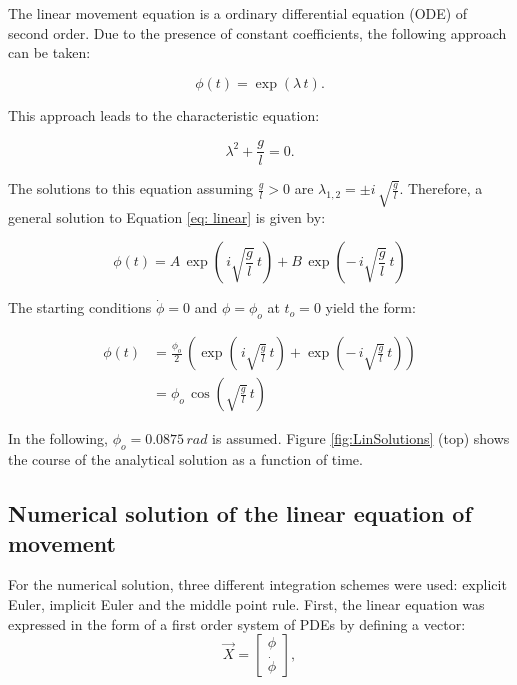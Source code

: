 \documentclass[12pt,bibstyle=none,pagenumberinfooter]{ifmdocument}
\begin{document}
The linear movement equation is a ordinary differential equation (ODE) of second order. Due to the presence of constant coefficients, the following approach can be taken:

\begin{equation}
    \label{eq: linear}
    \phi (t) = \exp{(\lambda \, t)}.
\end{equation}

This approach leads to the characteristic equation:

\begin{equation}
    \lambda^2 + \frac{g}{l} = 0.
\end{equation}

The solutions to this equation assuming $\frac{g}{l}>0$ are $\lambda_{1,2} = \pm i\,\sqrt{\frac{g}{l}}$. Therefore, a general solution to Equation \ref{eq: linear} is given by:

\begin{equation}
    \phi (t) = A\,\exp{\left(\,i\sqrt{\frac{g}{l}}\,t\right)} + B\, \exp{\left(-\,i\sqrt{\frac{g}{l}}\,t\right)}
\end{equation}

The starting conditions $\Dot{\phi} = 0$ and $\phi = \phi_o$ at $t_o = 0$ yield the form:

\begin{align}
    \phi(t)
     & = \frac{\phi_o}{2}\, \left(\exp{\left(\,i\sqrt{\frac{g}{l}}\,t\right)} + \exp{\left(-\,i\sqrt{\frac{g}{l}}\,t\right)} \right) \\
     & = \phi_o\,\cos{\left(\sqrt{\frac{g}{l}}\,t \right)}
\end{align}

In the following, $\phi_o = 0.0875\,rad$ is assumed. Figure \ref{fig:LinSolutions} (top) shows the course of the analytical solution as a function of time.


\subsection{Numerical solution of the linear equation of movement}

For the numerical solution, three different integration schemes were used: explicit Euler, implicit Euler and the middle point rule. First, the linear equation was expressed in the form of a first order system of PDEs by defining a vector:
\begin{equation}
    \Vec{X} = \begin{bmatrix}
        \phi \\ \Dot{\phi}
    \end{bmatrix},
\end{equation}
\end{document}
